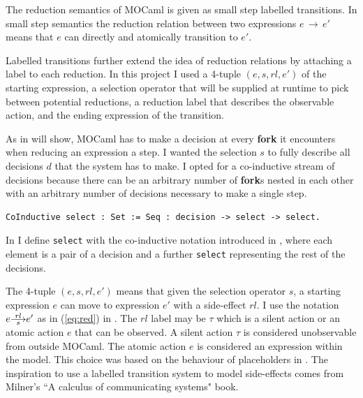 \documentclass[12pt,twoside,notitlepage]{report}
\newcommand{\red}[2]{\stackon[.05ex]{\stackunder[-0.05ex]{$\longrightarrow$}{$\scriptstyle #1$}}{$\scriptstyle #2$}}
\theoremstyle{plain}%
\theoremstyle{definition}
\theoremstyle{remark}
\begin{document}
The reduction semantics of MOCaml is given as small step labelled transitions. In small step semantics the reduction relation between two expressions $ e\, \rightarrow\, e' $ means that $ e $ can directly and atomically transition to $ e' $. 

Labelled transitions further extend the idea of reduction relations by attaching a label to each reduction. In this project I used a 4-tuple $ (e, s, rl, e') $ of the starting expression, a selection operator that will be supplied at runtime to pick between potential reductions, a reduction label that describes the observable action, and the ending expression of the transition.

As  in  will show, MOCaml has to make a decision at every \textbf{fork} it encounters when reducing an expression a step. I wanted the selection $ s $ to fully describe all decisions $ d $ that the system has to make. I opted for a co-inductive stream of decisions because there can be an arbitrary number of \textbf{fork}s nested in each other with an arbitrary number of decisions necessary to make a single step. \vspace{5mm}

\begin{minipage}{\linewidth}

\begin{lstlisting}[language={Coq},caption={Coq co-inductive decision sequence}, label={lst:coqselectstar}]
CoInductive select : Set := Seq : decision -> select -> select.
\end{lstlisting}

\end{minipage}

In  I define \verb|select| with the co-inductive notation introduced in , where each element is a pair of a decision and a further \verb|select| representing the rest of the decisions. 

The 4-tuple $ (e, s, rl, e') $ means that given the selection operator $ s $, a starting expression $ e $  can move to expression $ e' $ with a side-effect $ rl $. I use the notation $ e \red{s}{rl} e' $ as in (\ref{eq:red}) in . The $ rl $ label may be $ \tau $ which is a silent action or an atomic action $ e $ that can be observed. A silent action $\tau$ is considered unobservable from outside MOCaml. The atomic action $e$ is considered an expression within the model.  This choice was based on the behaviour of placeholders in . The inspiration to use a labelled transition system to model side-effects comes from Milner's ``A calculus of communicating systems" book\cite{milner1982calculus}.
\end{document}
